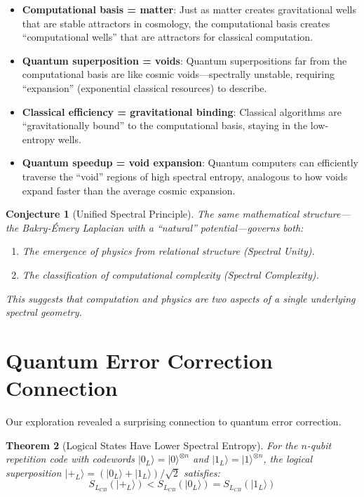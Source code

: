 \documentclass[11pt,a4paper]{article}
\theoremstyle{plain}
\newtheorem{theorem}{Theorem}[section]
\newtheorem{conjecture}[theorem]{Conjecture}
\theoremstyle{definition}
\theoremstyle{remark}
\newcommand{\ket}[1]{|#1\rangle}
\begin{document}
\begin{itemize}[noitemsep]
    \item \textbf{Computational basis = matter}: Just as matter creates gravitational wells that are stable attractors in cosmology, the computational basis creates ``computational wells'' that are attractors for classical computation.

    \item \textbf{Quantum superposition = voids}: Quantum superpositions far from the computational basis are like cosmic voids---spectrally unstable, requiring ``expansion'' (exponential classical resources) to describe.

    \item \textbf{Classical efficiency = gravitational binding}: Classical algorithms are ``gravitationally bound'' to the computational basis, staying in the low-entropy wells.

    \item \textbf{Quantum speedup = void expansion}: Quantum computers can efficiently traverse the ``void'' regions of high spectral entropy, analogous to how voids expand faster than the average cosmic expansion.
\end{itemize}

\begin{conjecture}[Unified Spectral Principle]
The same mathematical structure---the Bakry-\'Emery Laplacian with a ``natural'' potential---governs both:
\begin{enumerate}[label=(\roman*),noitemsep]
    \item The emergence of physics from relational structure (Spectral Unity).
    \item The classification of computational complexity (Spectral Complexity).
\end{enumerate}
This suggests that computation and physics are two aspects of a single underlying spectral geometry.
\end{conjecture}

\section{Quantum Error Correction Connection}

Our exploration revealed a surprising connection to quantum error correction.

\begin{theorem}[Logical States Have Lower Spectral Entropy]\label{thm:qec-entropy}
For the $n$-qubit repetition code with codewords $\ket{0_L} = \ket{0}^{\otimes n}$ and $\ket{1_L} = \ket{1}^{\otimes n}$, the logical superposition $\ket{+_L} = (\ket{0_L} + \ket{1_L})/\sqrt{2}$ satisfies:
\begin{equation}
    S_{L_{CB}}(\ket{+_L}) < S_{L_{CB}}(\ket{0_L}) = S_{L_{CB}}(\ket{1_L})
\end{equation}
\end{theorem}
\end{document}
